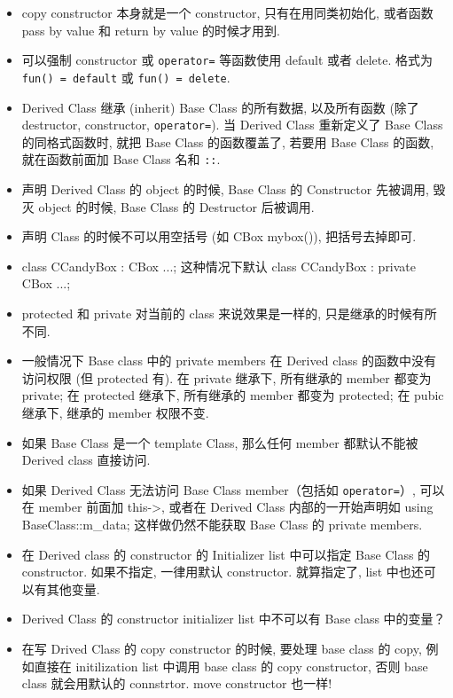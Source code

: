 
\begin{issues}
\issueDraft
\end{issues}

\begin{itemize}
\item copy constructor 本身就是一个 constructor, 只有在用同类初始化, 或者函数 pass by value 和 return by value 的时候才用到.
\item 可以强制 constructor 或 \verb|operator=| 等函数使用 default 或者 delete. 格式为 \verb|fun() = default| 或 \verb|fun() = delete|.
\item Derived Class 继承 (inherit) Base Class 的所有数据, 以及所有函数 (除了 destructor, constructor, \verb|operator=|). 当 Derived Class 重新定义了 Base Class 的同格式函数时, 就把 Base Class 的函数覆盖了, 若要用 Base Class 的函数, 就在函数前面加 Base Class 名和 \verb|::|.
\item 声明 Derived Class 的 object 的时候, Base Class 的 Constructor 先被调用, 毁灭 object 的时候, Base Class 的 Destructor 后被调用.
\item 声明 Class 的时候不可以用空括号 (如 CBox mybox()), 把括号去掉即可.
\item class CCandyBox : CBox {...}; 这种情况下默认 class CCandyBox : private CBox {...};
\item protected 和 private 对当前的 class 来说效果是一样的, 只是继承的时候有所不同.
\item 一般情况下 Base class 中的 private members 在 Derived class 的函数中没有访问权限 (但 protected 有). 在 private 继承下, 所有继承的 member 都变为 private; 在 protected 继承下, 所有继承的 member 都变为 protected; 在 pubic 继承下, 继承的 member 权限不变.
\item 如果 Base Class 是一个 template Class, 那么任何 member 都默认不能被 Derived class 直接访问.
\item 如果 Derived Class 无法访问 Base Class member（包括如 \verb|operator=|）, 可以在 member 前面加 this->, 或者在 Derived Class 内部的一开始声明如 using BaseClass::m_data; 这样做仍然不能获取 Base Class 的 private members.
\item 在 Derived class 的 constructor 的 Initializer list 中可以指定 Base Class 的 constructor. 如果不指定, 一律用默认 constructor. 就算指定了, list 中也还可以有其他变量.
\item Derived Class 的 constructor initializer list 中不可以有 Base class 中的变量？
\item 在写 Drived Class 的 copy constructor 的时候, 要处理 base class 的 copy, 例如直接在 initilization list 中调用 base class 的 copy constructor, 否则 base class 就会用默认的 connstrtor. move constructor 也一样!

\end{itemize}
